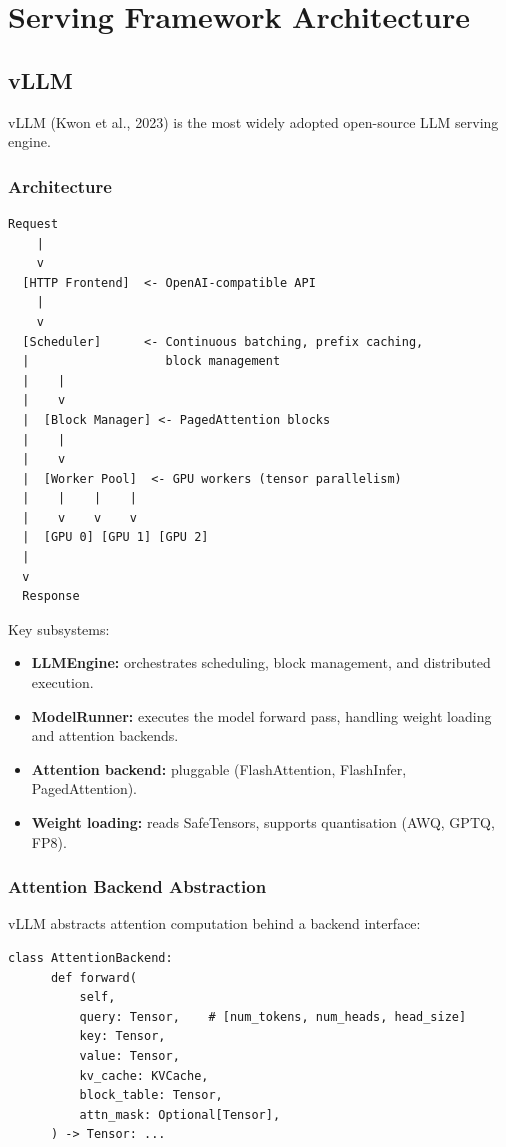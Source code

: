 \documentclass[11pt,a4paper]{article}
\theoremstyle{definition}
\begin{document}
\section{Serving Framework Architecture}
\label{sec:frameworks}

\subsection{vLLM}

vLLM (Kwon et al., 2023) is the most widely adopted open-source LLM serving engine.

\subsubsection{Architecture}

\begin{lstlisting}[caption=vLLM architecture overview]
  Request
    |
    v
  [HTTP Frontend]  <- OpenAI-compatible API
    |
    v
  [Scheduler]      <- Continuous batching, prefix caching,
  |                   block management
  |    |
  |    v
  |  [Block Manager] <- PagedAttention blocks
  |    |
  |    v
  |  [Worker Pool]  <- GPU workers (tensor parallelism)
  |    |    |    |
  |    v    v    v
  |  [GPU 0] [GPU 1] [GPU 2]
  |
  v
  Response
\end{lstlisting}

Key subsystems:
\begin{itemize}
	\item \textbf{LLMEngine:} orchestrates scheduling, block management, and distributed execution.
	\item \textbf{ModelRunner:} executes the model forward pass, handling weight loading and attention backends.
	\item \textbf{Attention backend:} pluggable (FlashAttention, FlashInfer, PagedAttention).
	\item \textbf{Weight loading:} reads SafeTensors, supports quantisation (AWQ, GPTQ, FP8).
\end{itemize}

\subsubsection{Attention Backend Abstraction}

vLLM abstracts attention computation behind a backend interface:

\begin{lstlisting}[caption=Attention backend interface (simplified)]
  class AttentionBackend:
      def forward(
          self,
          query: Tensor,    # [num_tokens, num_heads, head_size]
          key: Tensor,
          value: Tensor,
          kv_cache: KVCache,
          block_table: Tensor,
          attn_mask: Optional[Tensor],
      ) -> Tensor: ...
\end{lstlisting}
\end{document}
